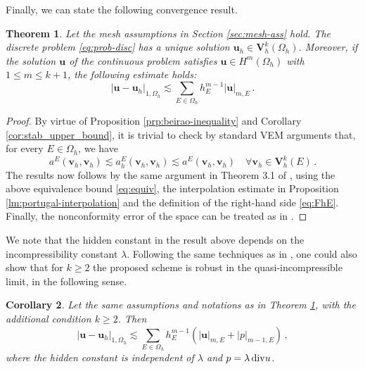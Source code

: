 \documentclass[a4paper,11pt]{article}
\newtheorem{theorem}{Theorem}
\newtheorem{corollary}[theorem]{Corollary}
\theoremstyle{remark}
\theoremstyle{definition}
\begin{document}
Finally, we can state the following convergence result.

\begin{theorem}\label{th:main}
Let the mesh assumptions in Section \ref{sec:mesh-ass} hold.
The discrete problem \eqref{eq:prob-disc} has a unique solution $\mathbf{u}_h \in \mathbf{V}_h^k(\Omega_h)$. Moreover, if the solution $\mathbf{u}$ of the continuous problem satisfies $\mathbf{u} \in H^m(\Omega_h)$ with $1 \leq m \leq k+1$, the following estimate holds:
\[
| \mathbf{u} - \mathbf{u}_h |_{1,\Omega_h} 
\lesssim 
\sum_{E \in \Omega_h} h_E^{m-1} | \mathbf{u} |_{m,E} \, .
\]
\end{theorem}
\begin{proof}
By virtue of Proposition \ref{prp:beirao-inequality} and Corollary \ref{cor:stab_upper_bound}, it is trivial to check by standard VEM arguments \cite{BeiradaVeiga-Brezzi-Cangiani-Manzini-Marini-Russo:2013} that, for every $E \in \Omega_h$, we have
\begin{equation}\label{eq:equiv}
a^E(\mathbf{v}_h, \mathbf{v}_h) \lesssim a_h^E(\mathbf{v}_h, \mathbf{v}_h) \lesssim a^E(\mathbf{v}_h, \mathbf{v}_h) \quad \forall \mathbf{v}_h \in \mathbf{V}_h^k(E) \, .
\end{equation}
The results now follows by the same argument in Theorem 3.1 of \cite{BeiradaVeiga-Brezzi-Cangiani-Manzini-Marini-Russo:2013},
using the above equivalence bound \eqref{eq:equiv}, the interpolation estimate in Proposition \ref{lm:portugal-interpolation} and the definition of the right-hand side \eqref{eq:FhE}.
Finally, the nonconformity error of the space can be treated as in \cite{AyusodeDios-Lipnikov-Manzini:2016, curvo-Yi}.
\end{proof}

We note that the hidden constant in the result above depends on the incompressibility constant $\lambda$. Following the same techniques as in \cite{BeiraodaVeiga-Brezzi-Marini:2013}, one could also show that for $k \ge 2$ the proposed scheme is robust in the quasi-incompressible limit, in the following sense.

\begin{corollary}
Let the same assumptions and notations as in Theorem \ref{th:main}, with the additional condition $k \ge 2$. Then 
\[
| \mathbf{u} - \mathbf{u}_h |_{1,\Omega_h} 
\lesssim 
\sum_{E \in \Omega_h} h_E^{m-1} ( | \mathbf{u} |_{m,E} + | {p} |_{m-1,E} )\, ,
\]
where the hidden constant is independent of $\lambda$ and $p = \lambda \, {\rm div} u$.
\end{corollary}
\end{document}
